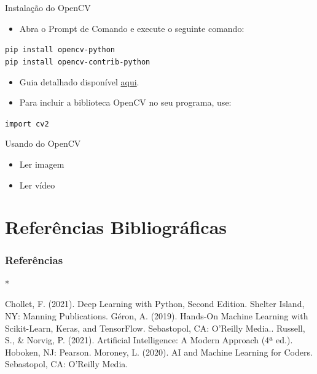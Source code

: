 \documentclass{beamer}
\begin{document}
\begin{frame}{Instalação do OpenCV }
    \begin{itemize}
        \item Abra o Prompt de Comando e execute o seguinte comando:
        \end{itemize}
        \begin{center}
            \texttt{pip install opencv-python}\\
            \texttt{pip install opencv-contrib-python}
        \end{center}
    \begin{itemize}
        \item Guia detalhado disponível \href{https://github.com/opencv/opencv-python}{aqui}.
        \item Para incluir a biblioteca OpenCV no seu programa, use:
        \end{itemize}
        \begin{center}
            \texttt{import cv2}
        \end{center}
\end{frame}

\begin{frame}{Usando do OpenCV }
    \begin{itemize}
     \item Ler imagem
     \item Ler vídeo
    \end{itemize}

\end{frame}

\section{Referências Bibliográficas}
\begin{frame}[t,allowframebreaks]
\frametitle{Referências}
%
%
\begin{thebibliography}{*}

          Chollet, F. (2021). Deep Learning with Python, Second Edition. Shelter Island, NY: Manning Publications.
         Géron, A. (2019). Hands-On Machine Learning with Scikit-Learn, Keras, and TensorFlow. Sebastopol, CA: O'Reilly Media..
         Russell, S., \& Norvig, P. (2021). Artificial Intelligence: A Modern Approach (4ª ed.). Hoboken, NJ: Pearson.
        Moroney, L. (2020). AI and Machine Learning for Coders. Sebastopol, CA: O'Reilly Media.




\end{thebibliography}
\end{frame}
\section{}


\begin{frame}
\titlepage
\end{frame}
\end{document}
